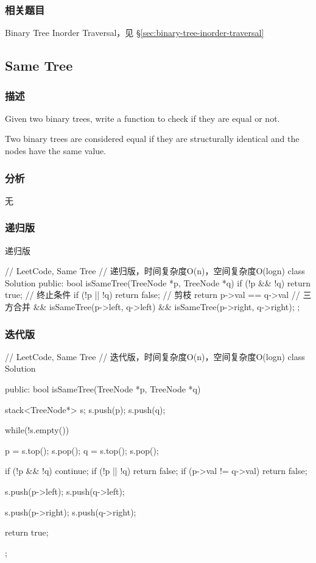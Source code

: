 \subsubsection{相关题目}
\begindot
\item Binary Tree Inorder Traversal，见 \S \ref{sec:binary-tree-inorder-traversal}
\myenddot


\subsection{Same Tree}
\label{sec:same-tree}


\subsubsection{描述}
Given two binary trees, write a function to check if they are equal or not.

Two binary trees are considered equal if they are structurally identical and the nodes have the same value.


\subsubsection{分析}
无


\subsubsection{递归版}
递归版
\begin{Code}
// LeetCode, Same Tree
// 递归版，时间复杂度O(n)，空间复杂度O(logn)
class Solution {
public:
    bool isSameTree(TreeNode *p, TreeNode *q) {
        if (!p && !q) return true;   // 终止条件
        if (!p || !q) return false;  // 剪枝
        return p->val == q->val      // 三方合并
                && isSameTree(p->left, q->left)
                && isSameTree(p->right, q->right);
    }
};
\end{Code}


\subsubsection{迭代版}
\begin{Code}
// LeetCode, Same Tree
// 迭代版，时间复杂度O(n)，空间复杂度O(logn)
class Solution {
public:
    bool isSameTree(TreeNode *p, TreeNode *q) {
        stack<TreeNode*> s;
        s.push(p);
        s.push(q);

        while(!s.empty()) {
            p = s.top(); s.pop();
            q = s.top(); s.pop();

            if (!p && !q) continue;
            if (!p || !q) return false;
            if (p->val != q->val) return false;

            s.push(p->left);
            s.push(q->left);

            s.push(p->right);
            s.push(q->right);
        }
        return true;
    }
};
\end{Code}



